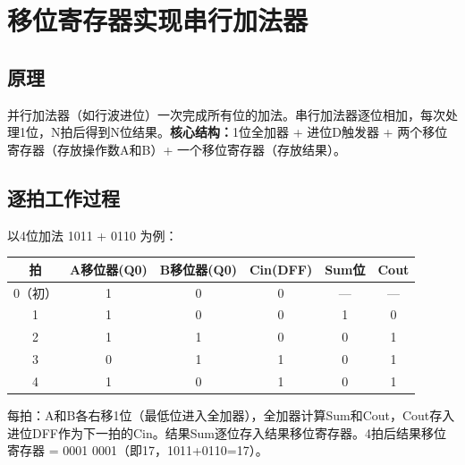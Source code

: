 \section{移位寄存器实现串行加法器}

\subsection{原理}

并行加法器（如行波进位）一次完成所有位的加法。串行加法器逐位相加，每次处理1位，N拍后得到N位结果。\textbf{核心结构：}1位全加器 + 进位D触发器 + 两个移位寄存器（存放操作数A和B）+ 一个移位寄存器（存放结果）。

\subsection{逐拍工作过程}

以4位加法 1011 + 0110 为例：

\begin{center}
\begin{tabular}{|c|c|c|c|c|c|}
\hline
拍 & A移位器(Q0) & B移位器(Q0) & Cin(DFF) & Sum位 & Cout \\
\hline
0（初）& 1 & 0 & 0 & — & — \\
1 & 1 & 0 & 0 & 1 & 0 \\
2 & 1 & 1 & 0 & 0 & 1 \\
3 & 0 & 1 & 1 & 0 & 1 \\
4 & 1 & 0 & 1 & 0 & 1 \\
\hline
\end{tabular}
\end{center}

每拍：A和B各右移1位（最低位进入全加器），全加器计算Sum和Cout，Cout存入进位DFF作为下一拍的Cin。结果Sum逐位存入结果移位寄存器。4拍后结果移位寄存器 = 0001 0001（即17，1011+0110=17）。

